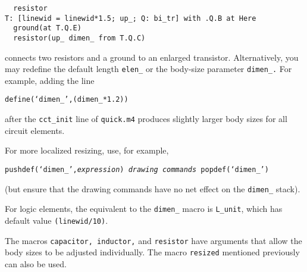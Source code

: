 \begin{verbatim}
  resistor
T: [linewid = linewid*1.5; up_; Q: bi_tr] with .Q.B at Here
  ground(at T.Q.E)
  resistor(up_ dimen_ from T.Q.C)
\end{verbatim}

\noindent%
connects two resistors and a ground to an enlarged transistor.
Alternatively, you may redefine the default length {\tt elen\_}
or the body-size parameter {\tt dimen\_.}  For example, adding the line

{\tt define(`dimen\_',(dimen\_*1.2))}

\noindent%
after the {\tt cct\_init} line of {\tt quick.m4} produces slightly
larger body sizes for all circuit elements.

For more localized resizing, use, for example,
\par
{\tt pushdef(`dimen\_',{\sl expression}) {\sl drawing commands}
 popdef(`dimen\_')}
\par
\noindent
(but ensure that the drawing commands have no net effect on the {\tt dimen\_}
stack).

For logic elements, the
equivalent to the {\tt dimen\_} macro is {\tt L\_unit}, which has
default value {\tt (linewid/10)}.

The macros {\tt capacitor, inductor,} and {\tt resistor} have arguments
that allow the body sizes to be adjusted individually.  The macro
{\tt resized} mentioned previously can also be used.

